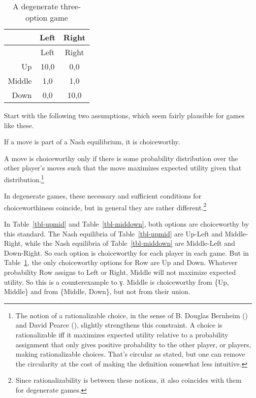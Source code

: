 \documentclass[
  10.5pt,
  twoside]{article}
\providecommand{\tightlist}{%
  \setlength{\itemsep}{0pt}\setlength{\parskip}{0pt}}
\let\olditemize\itemize
\let\endolditemize\enditemize
\renewenvironment{itemize}
  {\vskip 5pt\olditemize}
  {\endolditemize\vskip 5pt}
\begin{document}
\begin{longtable}[]{@{}rcc@{}}
\caption{A degenerate three-option
game}\label{tbl-allthree}\tabularnewline
\toprule\noalign{}
& Left & Right \\
\midrule\noalign{}
\endfirsthead
\toprule\noalign{}
& Left & Right \\
\midrule\noalign{}
\endhead
\bottomrule\noalign{}
\endlastfoot
Up & 10,0 & 0,0 \\
Middle & 1,0 & 1,0 \\
Down & 0,0 & 10,0 \\
\end{longtable}

Start with the following two assumptions, which seem fairly plausible
for games like these.

\begin{itemize}
\tightlist
\item
  If a move is part of a Nash equilibrium, it is choiceworthy.
\item
  A move is choiceworthy only if there is some probability distribution
  over the other player's moves such that the move maximizes expected
  utility given that distribution.\footnote{The notion of a
    rationalizable choice, in the sense of B. Douglas Bernheim
    () and David Pearce
    (), slightly strengthens this
    constraint. A choice is rationalizable iff it maximizes expected
    utility relative to a probability assignment that only gives
    positive probability to the other player, or players, making
    rationalizable choices. That's circular as stated, but one can
    remove the circularity at the cost of making the definition somewhat
    less intuitive.}
\end{itemize}

In degenerate games, these necessary and sufficient conditions for
choiceworthiness coincide, but in general they are rather
different.\footnote{Since rationalizability is between these notions, it
  also coincides with them for degenerate games.}

In Table~\ref{tbl-upmid} and Table~\ref{tbl-middown}, both options are
choiceworthy by this standard. The Nash equilibria of
Table~\ref{tbl-upmid} are Up-Left and Middle-Right, while the Nash
equilibria of Table~\ref{tbl-middown} are Middle-Left and Down-Right. So
each option is choiceworthy for each player in each game. But in
Table~\ref{tbl-allthree}, the only choiceworthy options for Row are Up
and Down. Whatever probability Row assigns to Left or Right, Middle will
not maximize expected utility. So this is a counterexample to γ. Middle
is choiceworthy from \{Up, Middle\} and from \{Middle, Down\}, but not
from their union.
\end{document}
